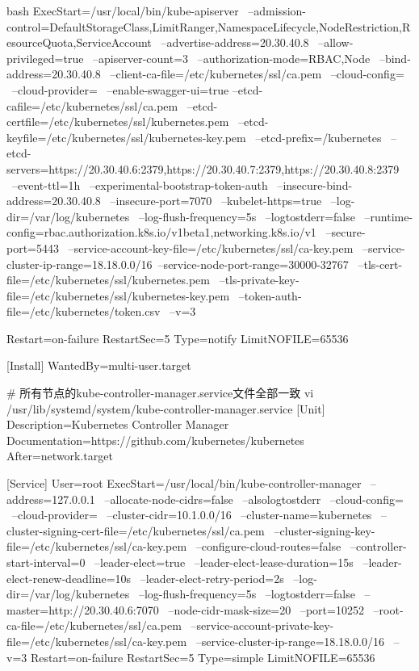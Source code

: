 \begin{outline}[enumerate]
\begin{code-block}{bash}
ExecStart=/usr/local/bin/kube-apiserver \
    --admission-control=DefaultStorageClass,LimitRanger,NamespaceLifecycle,NodeRestriction,ResourceQuota,ServiceAccount \
    --advertise-address=20.30.40.8 \
    --allow-privileged=true \
    --apiserver-count=3 \
    --authorization-mode=RBAC,Node \
    --bind-address=20.30.40.8 \
    --client-ca-file=/etc/kubernetes/ssl/ca.pem \
    --cloud-config= \
    --cloud-provider= \
    --enable-swagger-ui=true --etcd-cafile=/etc/kubernetes/ssl/ca.pem \
    --etcd-certfile=/etc/kubernetes/ssl/kubernetes.pem \
    --etcd-keyfile=/etc/kubernetes/ssl/kubernetes-key.pem \
    --etcd-prefix=/kubernetes \
    --etcd-servers=https://20.30.40.6:2379,https://20.30.40.7:2379,https://20.30.40.8:2379 \
    --event-ttl=1h \
    --experimental-bootstrap-token-auth \
    --insecure-bind-address=20.30.40.8 \
    --insecure-port=7070 \
    --kubelet-https=true \
    --log-dir=/var/log/kubernetes \
    --log-flush-frequency=5s \
    --logtostderr=false \
    --runtime-config=rbac.authorization.k8s.io/v1beta1,networking.k8s.io/v1 \
    --secure-port=5443 \
    --service-account-key-file=/etc/kubernetes/ssl/ca-key.pem \
    --service-cluster-ip-range=18.18.0.0/16\
    --service-node-port-range=30000-32767 \
    --tls-cert-file=/etc/kubernetes/ssl/kubernetes.pem \
    --tls-private-key-file=/etc/kubernetes/ssl/kubernetes-key.pem \
    --token-auth-file=/etc/kubernetes/token.csv \
    --v=3

Restart=on-failure
RestartSec=5
Type=notify
LimitNOFILE=65536

[Install]
WantedBy=multi-user.target

# 所有节点的kube-controller-manager.service文件全部一致
vi /usr/lib/systemd/system/kube-controller-manager.service
[Unit]
Description=Kubernetes Controller Manager
Documentation=https://github.com/kubernetes/kubernetes
After=network.target

[Service]
User=root
ExecStart=/usr/local/bin/kube-controller-manager \
    --address=127.0.0.1 \
    --allocate-node-cidrs=false \
    --alsologtostderr \
    --cloud-config= \
    --cloud-provider= \
    --cluster-cidr=10.1.0.0/16 \
    --cluster-name=kubernetes \
    --cluster-signing-cert-file=/etc/kubernetes/ssl/ca.pem \
    --cluster-signing-key-file=/etc/kubernetes/ssl/ca-key.pem \
    --configure-cloud-routes=false \
    --controller-start-interval=0 \
    --leader-elect=true \
    --leader-elect-lease-duration=15s \
    --leader-elect-renew-deadline=10s \
    --leader-elect-retry-period=2s \
    --log-dir=/var/log/kubernetes \
    --log-flush-frequency=5s \
    --logtostderr=false \
    --master=http://20.30.40.6:7070 \
    --node-cidr-mask-size=20 \
    --port=10252 \
    --root-ca-file=/etc/kubernetes/ssl/ca.pem \
    --service-account-private-key-file=/etc/kubernetes/ssl/ca-key.pem \
    --service-cluster-ip-range=18.18.0.0/16 \
    --v=3
Restart=on-failure
RestartSec=5
Type=simple
LimitNOFILE=65536


\end{code-block}
\end{outline}

